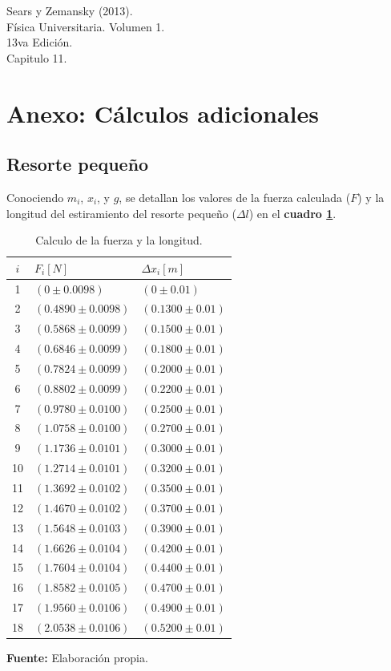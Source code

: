 \documentclass[letter,11pt]{article}
\newcommand{\source}[1]{\vspace{-11pt} \caption*{\small{\textbf{Fuente:} {#1}}}}
\begin{document}
\begin{thebibliography}{99}

 Sears y Zemansky (2013).\\
Física Universitaria. Volumen 1.\\
13va Edición.\\
Capitulo 11.

\end{thebibliography}

\newpage
\section*{Anexo: Cálculos adicionales}

\subsection{Resorte pequeño}
Conociendo $m_i$, $x_i$, y $g$, se detallan los valores de la fuerza calculada
($F$) y la longitud del estiramiento del resorte pequeño ($\Delta l$) en el
\textbf{cuadro \ref{cuadro3}}.

\begin{table}[!h]
\begin{center}
\begin{tabular}{|c|>{\centering}m{5.0cm}<{\centering}
                  |>{\centering}m{5.0cm}<{\centering}|}
\hline
$i$ & $F_i [N]$ & $\Delta x_i [m] $ \tabularnewline \hline
 1 & $(     0 \pm 0.0098)$ & $(     0 \pm 0.01)$ \tabularnewline \hline
 2 & $(0.4890 \pm 0.0098)$ & $(0.1300 \pm 0.01)$ \tabularnewline \hline
 3 & $(0.5868 \pm 0.0099)$ & $(0.1500 \pm 0.01)$ \tabularnewline \hline
 4 & $(0.6846 \pm 0.0099)$ & $(0.1800 \pm 0.01)$ \tabularnewline \hline
 5 & $(0.7824 \pm 0.0099)$ & $(0.2000 \pm 0.01)$ \tabularnewline \hline
 6 & $(0.8802 \pm 0.0099)$ & $(0.2200 \pm 0.01)$ \tabularnewline \hline
 7 & $(0.9780 \pm 0.0100)$ & $(0.2500 \pm 0.01)$ \tabularnewline \hline
 8 & $(1.0758 \pm 0.0100)$ & $(0.2700 \pm 0.01)$ \tabularnewline \hline
 9 & $(1.1736 \pm 0.0101)$ & $(0.3000 \pm 0.01)$ \tabularnewline \hline
10 & $(1.2714 \pm 0.0101)$ & $(0.3200 \pm 0.01)$ \tabularnewline \hline
11 & $(1.3692 \pm 0.0102)$ & $(0.3500 \pm 0.01)$ \tabularnewline \hline
12 & $(1.4670 \pm 0.0102)$ & $(0.3700 \pm 0.01)$ \tabularnewline \hline
13 & $(1.5648 \pm 0.0103)$ & $(0.3900 \pm 0.01)$ \tabularnewline \hline
14 & $(1.6626 \pm 0.0104)$ & $(0.4200 \pm 0.01)$ \tabularnewline \hline
15 & $(1.7604 \pm 0.0104)$ & $(0.4400 \pm 0.01)$ \tabularnewline \hline
16 & $(1.8582 \pm 0.0105)$ & $(0.4700 \pm 0.01)$ \tabularnewline \hline
17 & $(1.9560 \pm 0.0106)$ & $(0.4900 \pm 0.01)$ \tabularnewline \hline
18 & $(2.0538 \pm 0.0106)$ & $(0.5200 \pm 0.01)$ \tabularnewline \hline
\end{tabular}
\caption{Calculo de la fuerza y la longitud.}
\label{cuadro3}
\source{Elaboración propia.}
\end{center}
\end{table}
\end{document}
